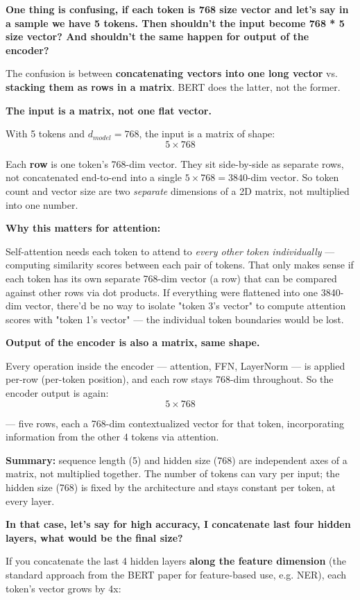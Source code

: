 \textbf{One thing is confusing, if each token is 768 size vector and let's say in a sample we have 5 tokens. Then shouldn't the input become 768 * 5 size vector? And shouldn't the same happen for output of the encoder?}

The confusion is between \textbf{concatenating vectors into one long vector} vs. \textbf{stacking them as rows in a matrix}. BERT does the latter, not the former.

\textbf{The input is a matrix, not one flat vector.}

With 5 tokens and $d_{model}=768$, the input is a matrix of shape:
\[
5 \times 768
\]

Each \textbf{row} is one token's 768-dim vector. They sit side-by-side as separate rows, not concatenated end-to-end into a single $5 \times 768 = 3840$-dim vector. So token count and vector size are two \textit{separate} dimensions of a 2D matrix, not multiplied into one number.

\textbf{Why this matters for attention:}

Self-attention needs each token to attend to \textit{every other token individually} --- computing similarity scores between each pair of tokens. That only makes sense if each token has its own separate 768-dim vector (a row) that can be compared against other rows via dot products. If everything were flattened into one 3840-dim vector, there'd be no way to isolate "token 3's vector" to compute attention scores with "token 1's vector" --- the individual token boundaries would be lost.

\textbf{Output of the encoder is also a matrix, same shape.}

Every operation inside the encoder --- attention, FFN, LayerNorm --- is applied per-row (per-token position), and each row stays 768-dim throughout. So the encoder output is again:
\[
5 \times 768
\]

--- five rows, each a 768-dim contextualized vector for that token, incorporating information from the other 4 tokens via attention.

\textbf{Summary:} sequence length (5) and hidden size (768) are independent axes of a matrix, not multiplied together. The number of tokens can vary per input; the hidden size (768) is fixed by the architecture and stays constant per token, at every layer.

\textbf{In that case, let's say for high accuracy, I concatenate last four hidden layers, what would be the final size?}

If you concatenate the last 4 hidden layers \textbf{along the feature dimension} (the standard approach from the BERT paper for feature-based use, e.g. NER), each token's vector grows by 4x:

